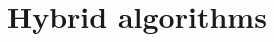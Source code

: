 \documentclass[letter,12pt]{article}
\begin{document}
\vfill
\clearpage %

\section{Hybrid algorithms}
\label{sec:hybrids}

\vfill
\clearpage %

\nocite{*}
\printbibheading[title={References}]
\printbibliography[heading=none]
\end{document}
